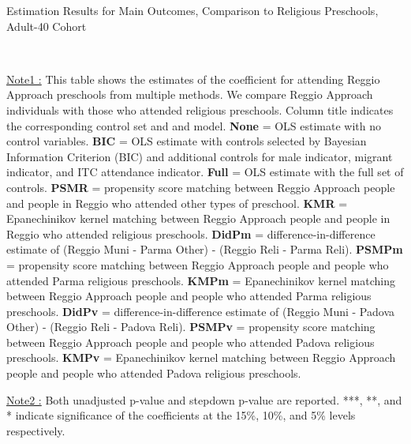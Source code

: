 \begin{table}[H] \caption{Estimation Results for Main Outcomes, Comparison to Religious Preschools, Adult-40 Cohort} \label{ols-M-adult40-reg-reli}
\scalebox{0.59}{}
\vspace{1ex} \\
\footnotesize\raggedright{\underline{Note1 :} This table shows the estimates of the coefficient for attending Reggio Approach preschools from multiple methods. We compare Reggio Approach individuals with those who attended religious preschools. Column title indicates the corresponding control set and and model. \textbf{None} = OLS estimate with no control variables. \textbf{BIC} = OLS estimate with controls selected by Bayesian Information Criterion (BIC) and additional controls for male indicator, migrant indicator, and ITC attendance indicator. \textbf{Full} = OLS estimate with the full set of controls. \textbf{PSMR} =  propensity score matching between Reggio Approach people and people in Reggio who attended other types of preschool. \textbf{KMR} = Epanechinikov kernel matching between Reggio Approach people and people in Reggio who attended religious preschools. \textbf{DidPm} = difference-in-difference estimate of (Reggio Muni - Parma Other) - (Reggio Reli - Parma Reli). \textbf{PSMPm} = propensity score matching between Reggio Approach people and people who attended Parma religious preschools. \textbf{KMPm} = Epanechinikov kernel matching between Reggio Approach people and people who attended Parma religious preschools. \textbf{DidPv} = difference-in-difference estimate of (Reggio Muni - Padova Other) - (Reggio Reli - Padova Reli). \textbf{PSMPv} = propensity score matching between Reggio Approach people and people who attended Padova religious preschools. \textbf{KMPv} = Epanechinikov kernel matching between Reggio Approach people and people who attended Padova religious preschools.} 

\footnotesize\raggedright{\underline{Note2 :} Both unadjusted p-value and stepdown p-value are reported. ***, **, and * indicate significance of the coefficients at the 15\%, 10\%, and 5\% levels respectively.}

\end{table}











